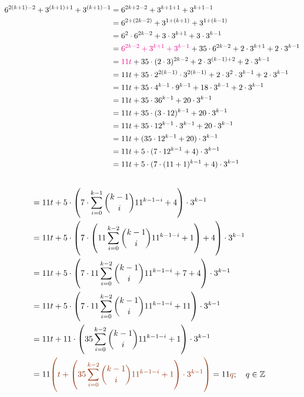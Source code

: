 \documentclass[12pt, a4paper]{article}
\newcommand{\Z}{\mathbb{Z}}
\begin{document}
\begin{solution}
\begin{align*}
    6^{2(k+1)-2} + 3^{(k+1)+1}+3^{(k+1)-1} &= 6^{2k+2-2} + 3^{k+1+1} + 3^{k+1-1}\\&= 
    6^{2 + (2k-2)} + 3^{1 + (k+1)} + 3^{1 + (k-1)} \\&= 
    6^2 \cdot 6^{2k-2} + 3 \cdot 3^{k+1} + 3 \cdot 3^{k-1} \\&= \textcolor{Magenta}{6^{2k-2} + 3^{k+1} + 3^{k-1}} + 35 \cdot 6^{2k-2} + 2 \cdot 3^{k+1} + 2 \cdot 3^{k-1} \\&= 
    \textcolor{Magenta}{11t} + 35 \cdot (2 \cdot 3)^{2k - 2} + 2 \cdot 3^{(k - 1) + 2} + 2 \cdot 3^{k - 1}  \\&=
    11t + 35 \cdot 2^{2(k - 1)} \cdot 3^{2(k -1)} + 2  \cdot 3^2 \cdot 3^{k - 1} + 2 \cdot 3^{k - 1} \\&=
    11t + 35 \cdot 4^{k-1} \cdot 9^{k-1} + 18 \cdot 3^{k-1} + 2 \cdot 3^{k-1} \\&=
    11t + 35 \cdot 36^{k-1} + 20 \cdot 3^{k-1} \\&=
    11t + 35 \cdot (3 \cdot 12)^{k-1} + 20 \cdot 3^{k-1} \\&=
    11t + 35 \cdot 12^{k-1} \cdot 3^{k-1} + 20 \cdot 3^{k-1} \\&=
    11t + (35 \cdot 12^{k-1} + 20)\cdot 3^{k-1} \\&=
    11t + 5 \cdot (7 \cdot 12^{k-1} + 4)\cdot 3^{k-1} \\&=
    11t + 5 \cdot (7 \cdot (11+1)^{k-1} + 4)\cdot 3^{k-1} 
    \end{align*}
    \begin{align*}\\&=
    11t + 5 \cdot \left(7 \cdot \sum\limits_{i = 0}^{k-1} \binom{k-1}{i} 11^{k-1-i} + 4\right)\cdot 3^{k-1} \\&=
    11t + 5 \cdot \left(7 \cdot \left(11 \sum\limits_{i = 0}^{k-2} \binom{k-1}{i} 11^{k-1-i} + 1 \right) + 4\right)\cdot 3^{k-1} \\&=
    11t + 5 \cdot \left(7 \cdot 11 \sum\limits_{i = 0}^{k-2} \binom{k-1}{i} 11^{k-1-i} + 7 + 4\right)\cdot 3^{k-1} \\&=
    11t + 5 \cdot \left(7 \cdot 11 \sum\limits_{i = 0}^{k-2} \binom{k-1}{i} 11^{k-1-i} + 11\right)\cdot 3^{k-1} \\&=
    11t + 11 \cdot \left(35 \sum\limits_{i = 0}^{k-2} \binom{k-1}{i} 11^{k-1-i} + 1\right)\cdot 3^{k-1} \\&=
    11 \textcolor{RawSienna}{\left(t + \left(35 \sum\limits_{i = 0}^{k-2} \binom{k-1}{i} 11^{k-1-i} + 1\right)\cdot 3^{k-1}\right)}=11\textcolor{RawSienna}{q};  \quad  q \in \Z
\end{align*}

\end{solution}
\end{document}
